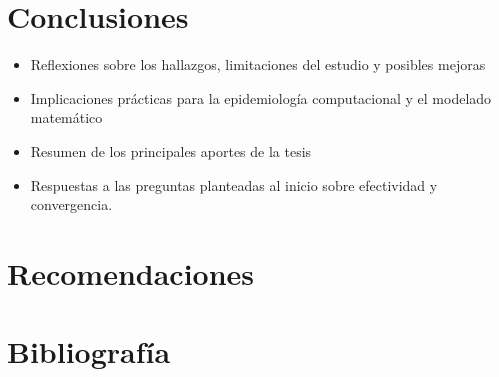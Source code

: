 \documentclass{article}
\begin{document}
\newpage

    \section*{ \Huge Conclusiones }
    \label{sec:19}
    \begin{itemize}
        \item  Reflexiones sobre los hallazgos, limitaciones del estudio y posibles mejoras
        \item  Implicaciones prácticas para la epidemiología computacional y el modelado matemático
       \item  Resumen de los principales aportes de la tesis
        \item  Respuestas a las preguntas planteadas al inicio sobre efectividad y convergencia.
    \end{itemize}

\newpage

\section*{ \Huge Recomendaciones }
\label{sec:20}

\newpage

\section*{ \Huge Bibliografía }
\label{sec:21}
\end{document}
